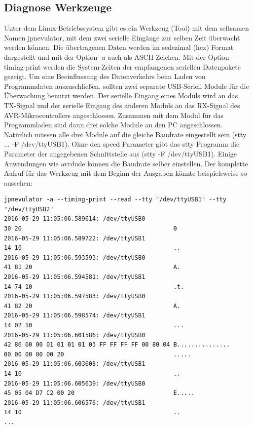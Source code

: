 \subsection{Diagnose Werkzeuge}
Unter dem Linux-Betriebssystem gibt es ein Werkzeug (Tool) mit dem seltsamen Namen jpnevulator, mit dem
zwei serielle Eingänge zur selben Zeit überwacht werden können.
Die übertragenen Daten werden im sedezimal (hex) Format dargestellt und mit der Option -a auch als ASCII-Zeichen.
Mit der Option --timing-print werden die System-Zeiten der empfangenen seriellen Datenpakete gezeigt.
Um eine Beeinflussung des Datenverkehrs beim Laden von Programmdaten auszuschließen, sollten
zwei separate USB-Seriell Module für die Überwachung benutzt werden.
Der serielle Eingang eines Moduls wird an das TX-Signal und der serielle Eingang des anderen Moduls
an das RX-Signal des AVR-Mikrocontrollers angeschlossen.
Zusammen mit dem Modul für das Programmladen sind dann drei solche Module an den PC angeschlossen.
Natürlich müssen alle drei Module auf die gleiche Baudrate eingestellt sein (stty ... -F /dev/ttyUSB1).
Ohne den speed Parameter gibt das stty Programm die Parameter der angegebenen Schnittstelle
aus (stty -F /dev/ttyUSB1).
Einige Anwendungen wie avrdude können die Baudrate selber einstellen.
Der komplette Aufruf für das Werkzeug mit dem Beginn der Ausgaben könnte beispielsweise so aussehen:
\begin{verbatim}
jpnevulator -a --timing-print --read --tty "/dev/ttyUSB1" --tty "/dev/ttyUSB2"
2016-05-29 11:05:06.589614: /dev/ttyUSB0
30 20                                           0
2016-05-29 11:05:06.589722: /dev/ttyUSB1
14 10                                           ..
2016-05-29 11:05:06.593593: /dev/ttyUSB0
41 81 20                                        A.
2016-05-29 11:05:06.594581: /dev/ttyUSB1
14 74 10                                        .t.
2016-05-29 11:05:06.597583: /dev/ttyUSB0
41 82 20                                        A.
2016-05-29 11:05:06.598574: /dev/ttyUSB1
14 02 10                                        ...
2016-05-29 11:05:06.601586: /dev/ttyUSB0
42 86 00 00 01 01 01 01 03 FF FF FF FF 00 80 04 B...............
00 00 00 80 00 20                               .....
2016-05-29 11:05:06.603608: /dev/ttyUSB1
14 10                                           ..
2016-05-29 11:05:06.605639: /dev/ttyUSB0
45 05 04 D7 C2 00 20                            E.....
2016-05-29 11:05:06.606576: /dev/ttyUSB1
14 10                                           ..
...
\end{verbatim}
